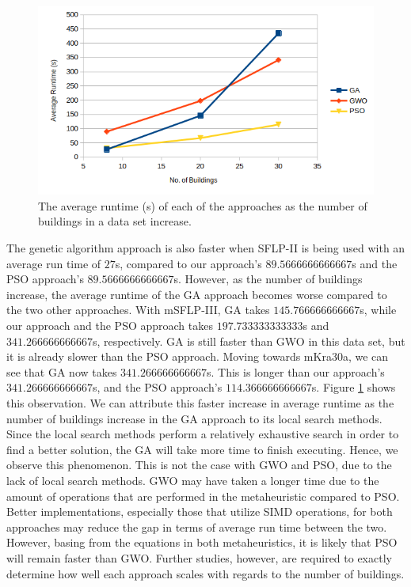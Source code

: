 \begin{figure}[h!]
\centering
\includegraphics[scale=0.65]{./images/chap07-rd/approaches-average-runtime-over-no-of-buildings.png}
\caption{The average runtime (s) of each of the approaches as the number of buildings in a data set increase.}
\label{graph-approaches-runtime-no-buildings}
\end{figure}

The genetic algorithm approach is also faster when SFLP-II is being used with an average run time of $27$s, compared to our approach's $89.5666666666667$s and the PSO approach's $89.5666666666667$s. However, as the number of buildings increase, the average runtime of the GA approach becomes worse compared to the two other approaches. With mSFLP-III, GA takes $145.766666666667$s, while our approach and the PSO approach takes $197.733333333333$s and $341.266666666667$s, respectively. GA is still faster than GWO in this data set, but it is already slower than the PSO approach. Moving towards mKra30a, we can see that GA now takes $341.266666666667$s. This is longer than our approach's $341.266666666667$s, and the PSO approach's $114.366666666667$s. Figure \ref{graph-approaches-runtime-no-buildings} shows this observation. We can attribute this faster increase in average runtime as the number of buildings increase in the GA approach to its local search methods. Since the local search methods perform a relatively exhaustive search in order to find a better solution, the GA will take more time to finish executing. Hence, we observe this phenomenon. This is not the case with GWO and PSO, due to the lack of local search methods. GWO may have taken a longer time due to the amount of operations that are performed in the metaheuristic compared to PSO. Better implementations, especially those that utilize SIMD operations, for both approaches may reduce the gap in terms of average run time between the two. However, basing from the equations in both metaheuristics, it is likely that PSO will remain faster than GWO. Further studies, however, are required to exactly determine how well each approach scales with regards to the number of buildings.

